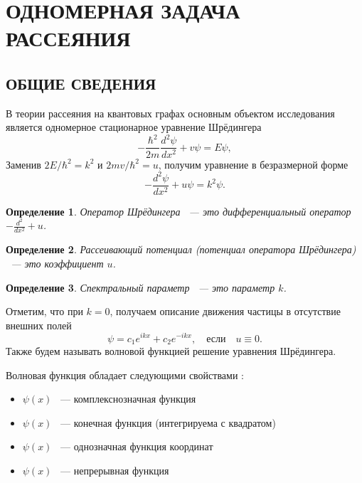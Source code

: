 \documentclass[a4 paper, 12 pt]{extarticle}
\newtheorem{Def}{Определение}[section]
\begin{document}
	
	\newpage
	\section{ОДНОМЕРНАЯ ЗАДАЧА РАССЕЯНИЯ}
	\subsection{ОБЩИЕ СВЕДЕНИЯ}
	В теории рассеяния на квантовых графах основным объектом исследования является одномерное стационарное уравнение Шрёдингера
   \begin{equation*}
   -\frac{\hbar^2}{2m}\frac{d^2\psi}{d x^2}+v\psi=E\psi,
   \end{equation*}
   Заменив $2E/\hbar^2=k^2$ и $2mv/\hbar^2=u$, получим уравнение в безразмерной форме
   \begin{equation}\label{Schred1D}
   -\frac{d^2\psi}{d x^2}+u\psi=k^2\psi.
   \end{equation}
   
   \begin{Def}
   	Оператор Шрёдингера ~--- это дифференциальный оператор \newline  $-\frac{d^2}{d x^2}+u$.
   \end{Def}

   \begin{Def}
   	Рассеивающий потенциал (потенциал оператора Шрёдингера) ~--- это коэффициент $u$.
   \end{Def}

   \begin{Def}
    Спектральный параметр ~--- это параметр $k$.
   \end{Def}
	Отметим, что при $k=0$, получаем описание движения частицы в отсутствие внешних полей
	\begin{equation*}
	\psi=c_1e^{ikx}+c_2e^{-ikx}, \quad \text{если} \quad u\equiv0.
	\end{equation*}
    Также будем называть волновой функцией решение уравнения Шрёдингера.
    
    Волновая функция обладает следующими свойствами \cite{Peisakhovich, Landau}:
    \begin{itemize}
    	\item $\psi\left(x\right)$ ~--- комплекснозначная функция
    	\item $\psi\left(x\right)$ ~--- конечная функция (интегрируема с квадратом)
    	\item $\psi\left(x\right)$ ~--- однозначная функция координат
    	\item $\psi\left(x\right)$ ~--- непрерывная функция
    \end{itemize}
\end{document}
